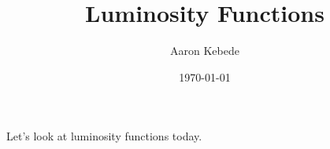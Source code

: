 \documentclass{article}
\title{Luminosity Functions}
\author{Aaron Kebede}
\date{\today}
\begin{document}
\maketitle

Let's look at luminosity functions today.
\end{document}
